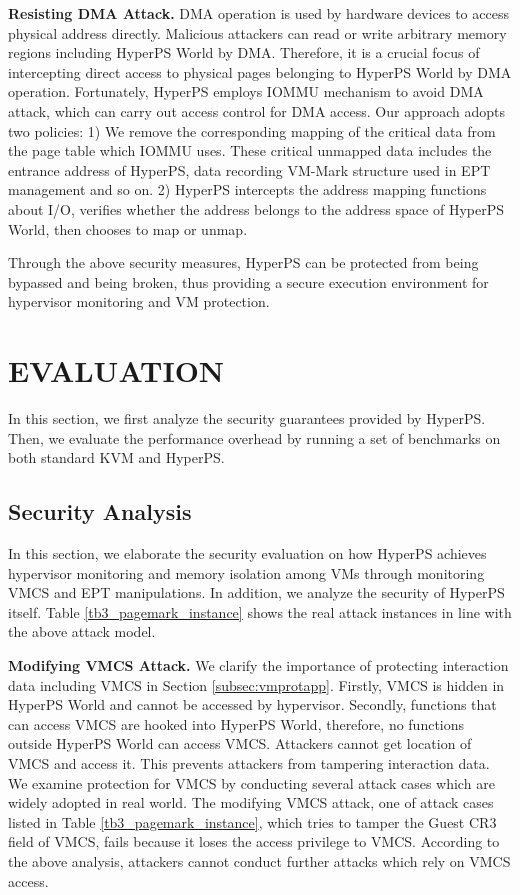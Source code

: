 \documentclass[10pt, numbers, preprint ]{sigplanconf}
\begin{document}
{\textbf{Resisting DMA Attack.} DMA operation is used by hardware devices to access physical address directly. Malicious attackers can read or write arbitrary memory regions including HyperPS World by DMA. Therefore, it is a crucial focus of intercepting direct access to physical pages belonging to HyperPS World by DMA operation. Fortunately, HyperPS employs IOMMU mechanism to avoid DMA attack, which can carry out access control for DMA access. Our approach adopts two policies: 1) We remove the corresponding mapping of the critical data from the page table which IOMMU uses. These critical unmapped data includes the entrance address of HyperPS, data recording VM-Mark structure used in EPT management and so on. 2) HyperPS intercepts the address mapping functions about I/O, verifies whether the address belongs to the address space of HyperPS World, then chooses to map or unmap.

Through the above security measures, HyperPS can be protected from being bypassed and being broken, thus providing a secure execution environment for hypervisor monitoring and VM protection.


\section{EVALUATION} \label{sec:evalu}
In this section, we first analyze the security guarantees provided by HyperPS. Then, we evaluate the performance overhead by running a set of benchmarks on both standard KVM and HyperPS.


\subsection{Security Analysis} \label{subsec:secuanal}
In this section, we elaborate the security evaluation on how HyperPS achieves hypervisor monitoring and memory isolation among VMs through monitoring VMCS and EPT manipulations. In addition, we analyze the security of HyperPS itself. Table \ref{tb3_pagemark_instance} shows the real attack instances in line with the above attack model.

\textbf{Modifying VMCS Attack.} We clarify the importance of protecting interaction data including VMCS in Section \ref{subsec:vmprotapp}. Firstly, VMCS is hidden in HyperPS World and cannot be accessed by hypervisor. Secondly, functions that can access VMCS are hooked into HyperPS World, therefore, no functions outside HyperPS World can access VMCS. Attackers cannot get location of VMCS and access it. This prevents attackers from tampering interaction data. We examine protection for VMCS by conducting several attack cases which are widely adopted in real world. The modifying VMCS attack, one of attack cases listed in Table \ref{tb3_pagemark_instance}, which tries to tamper the Guest CR3 field of VMCS, fails because it loses the access privilege to VMCS. According to the above analysis, attackers cannot conduct further attacks which rely on VMCS access.

}
\end{document}
